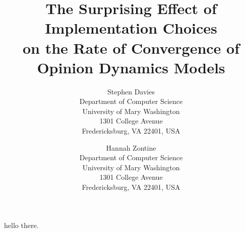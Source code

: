 \documentclass{wscpaperproc}
\begin{document}

\title{The Surprising Effect of Implementation Choices\\ on the Rate of
Convergence of Opinion Dynamics Models}

\author{Stephen Davies\\ [12pt]
Department of Computer Science \\
University of Mary Washington\\
1301 College Avenue \\
Fredericksburg, VA 22401, USA
\and
Hannah Zontine \\[12pt]
Department of Computer Science \\
University of Mary Washington\\
1301 College Avenue \\
Fredericksburg, VA 22401, USA
}

\maketitle

hello there.











\appendix

\vspace{6pt}



\end{document}
